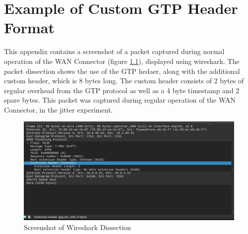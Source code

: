 
\cleardoublepage
\chapter{Example of Custom GTP Header Format}
\label{appendix:gtp}

This appendix contains a screenshot of a packet captured during normal operation of the WAN Connector (figure \ref{fig:wshark}), displayed using wireshark. The packet dissection shows the use of the GTP hedaer, along with the additional custom header, which is 8 bytes long. The custom header consists of 2 bytes of regular overhead from the GTP protocol as well as a 4 byte timestamp and 2 spare bytes. This packet was captured during regular operation of the WAN Connector, in the jitter experiment.

\begin{figure}[ht]
    \centering
	\includegraphics[width=\linewidth]{fig/gtp_2.png}
	\caption{Screenshot of Wireshark Dissection}
	\label{fig:wshark}
\end{figure} 

